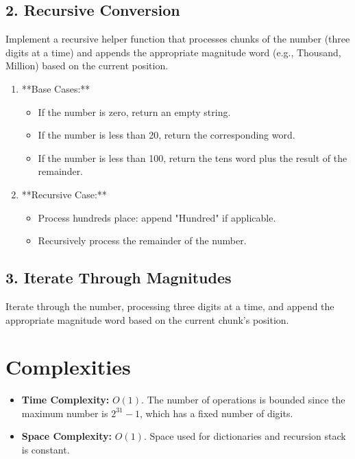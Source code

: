 \subsection*{2. Recursive Conversion}

Implement a recursive helper function that processes chunks of the number (three digits at a time) and appends the appropriate magnitude word (e.g., Thousand, Million) based on the current position.

\begin{enumerate}
    \item **Base Cases:**
    \begin{itemize}
        \item If the number is zero, return an empty string.
        \item If the number is less than 20, return the corresponding word.
        \item If the number is less than 100, return the tens word plus the result of the remainder.
    \end{itemize}
    
    \item **Recursive Case:**
    \begin{itemize}
        \item Process hundreds place: append "Hundred" if applicable.
        \item Recursively process the remainder of the number.
    \end{itemize}
\end{enumerate}

\subsection*{3. Iterate Through Magnitudes}

Iterate through the number, processing three digits at a time, and append the appropriate magnitude word based on the current chunk's position.


\section*{Complexities}

\begin{itemize}
    \item \textbf{Time Complexity:} \(O(1)\). The number of operations is bounded since the maximum number is \(2^{31} - 1\), which has a fixed number of digits.
    
    \item \textbf{Space Complexity:} \(O(1)\). Space used for dictionaries and recursion stack is constant.
\end{itemize}

